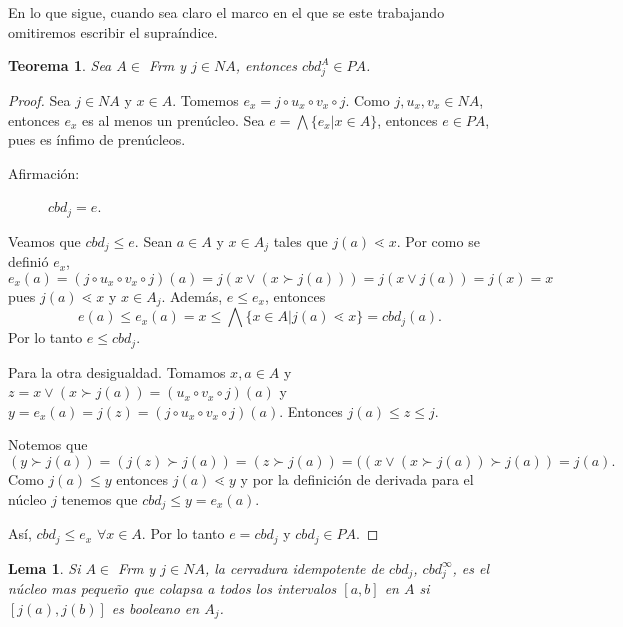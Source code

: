 \documentclass[12pt,letterpaper,titlepage]{article}
\newtheorem{lemma}{Lema}
\newtheorem{thm}{Teorema}
\theoremstyle{definition}
\newcommand\<{\langle}
\renewcommand\>{\rangle}
\begin{document}
En lo que sigue, cuando sea claro el marco en el que se este trabajando omitiremos escribir el supraíndice.

\begin{thm}
Sea $A\in$ \textit{Frm} y $j\in NA$, entonces $cbd_j^{A}\in PA$.
\end{thm}

\begin{proof}
Sea $j\in NA$ y $x\in A$. Tomemos $e_x=j\circ u_x\circ v_x\circ j$. Como $j, u_x, v_x\in NA$, entonces $e_x$ es al menos un prenúcleo. Sea $e=\bigwedge\{e_x|x\in A\}$, entonces $e\in PA$, pues es ínfimo de prenúcleos.
\begin{description}
\item[Afirmación:] $cbd_j=e$. 
\end{description}

Veamos que $cbd_j\leq e$. Sean $a\in A$ y $x\in A_j$ tales que $j(a)\lessdot x$. Por como se definió $e_x$, $e_x(a)=(j\circ u_x\circ v_x\circ j)(a)=j(x\vee (x\succ j(a)))=j(x\vee j(a))=j(x)=x$ pues $j(a)\lessdot x$ y $x\in A_j$. Además, $e\leq e_x$, entonces 
$$e(a)\leq e_x(a)=x\leq \bigwedge\{x\in A|j(a)\lessdot x\}=cbd_j(a).$$
Por lo tanto $e\leq cbd_j$.

Para la otra desigualdad. Tomamos $x,a\in A$ y $z=x\vee (x\succ j(a))=(u_x \circ v_x\circ j)(a)$ y $y=e_x(a)=j(z)=(j\circ u_x \circ v_x\circ j)(a)$. Entonces $j(a)\leq z\leq j$.

\noindent
Notemos que $$(y\succ j(a))=(j(z)\succ j(a))=(z\succ j(a))=((x\vee (x\succ j(a))\succ j(a))=j(a).$$ 
Como $j(a)\leq y$ entonces $j(a)\lessdot y$ y por la definición de derivada para el núcleo $j$ tenemos que $cbd_j\leq y=e_x(a)$.

\noindent
Así, $cbd_j\leq e_x$ $\forall x\in A$. Por lo tanto $e=cbd_j$ y $cbd_j\in PA$. 
\end{proof}

\begin{lemma}
Si $A\in$ \textit{Frm} y $j\in NA$, la cerradura idempotente de $cbd_j$, $cbd_j^{\infty}$, es el núcleo mas pequeño que colapsa a todos los intervalos $[a, b]$ en $A$ si $[j(a),j(b)]$ es booleano en $A_j$.
\end{lemma}
\end{document}
